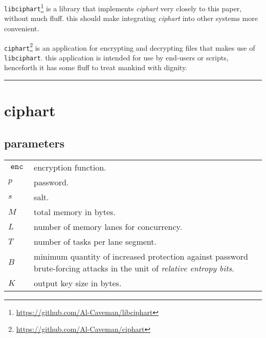 \documentclass[twocolumn]{article}
\DeclareMathOperator{\enc}{\mathtt{enc}}
\begin{document}
\texttt{libciphart}\footnote{\url{https://github.com/Al-Caveman/libciphart}}
is a library that implements \emph{ciphart} very closely to this paper,
without much fluff.  this should make integrating \emph{ciphart} into other
systems more convenient.

\texttt{ciphart}\footnote{\url{https://github.com/Al-Caveman/ciphart}} is
an application for encrypting and decrypting files that makes use of
\texttt{libciphart}.  this application is intended for use by end-users or
scripts, henceforth it has some fluff to treat mankind with dignity.

\tableofcontents
\noindent
\rule{1\columnwidth}{2pt}

\section{ciphart}
\subsection{parameters}
\begin{tabularx}{\columnwidth}{lX}
    $\enc$ & encryption function.\\
    $p$ & password.\\
    $s$ & salt.\\
    $M$ & total memory in bytes.\\
    $L$ & number of memory lanes for concurrency.\\
    $T$ & number of tasks per lane segment.\\
    $B$ & minimum quantity of increased protection against password
            brute-forcing attacks in the unit of \emph{relative entropy
            bits}.\\
    $K$ & output key size in bytes.\\
\end{tabularx}
\end{document}
